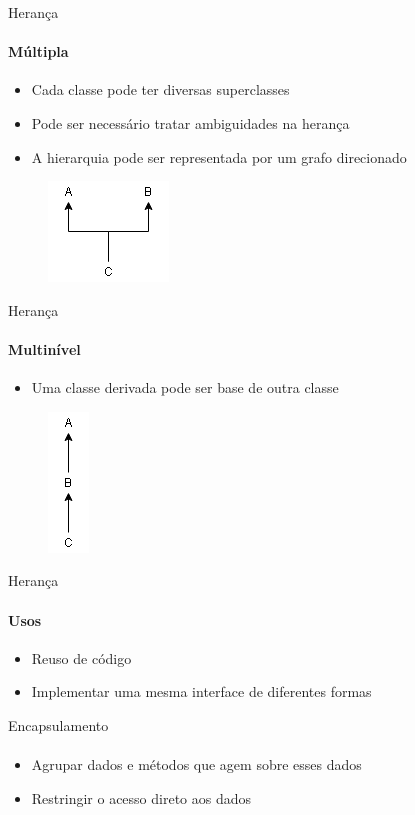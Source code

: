 \begin{frame}{Herança}
\framesubtitle{Múltipla}
\begin{itemize}
    \item Cada classe pode ter diversas superclasses
    \item Pode ser necessário tratar ambiguidades na herança
    \item A hierarquia pode ser representada por um grafo direcionado
\end{itemize}
\begin{figure}
	\includegraphics{img/multipla.png}
\end{figure}
\end{frame}

\begin{frame}{Herança}
\framesubtitle{Multinível}
\begin{itemize}
    \item Uma classe derivada pode ser base de outra classe
\end{itemize}
\begin{figure}
	\includegraphics{img/multinivel.png}
\end{figure}
\end{frame}

\begin{frame}{Herança}
\framesubtitle{Usos}
\begin{itemize}
    \item Reuso de código
    \item Implementar uma mesma interface de diferentes formas
\end{itemize}
\end{frame}

\begin{frame}{Encapsulamento}
\framesubtitle{}
\begin{itemize}
    \item Agrupar dados e métodos que agem sobre esses dados
    \item Restringir o acesso direto aos dados
\end{itemize}
\end{frame}

